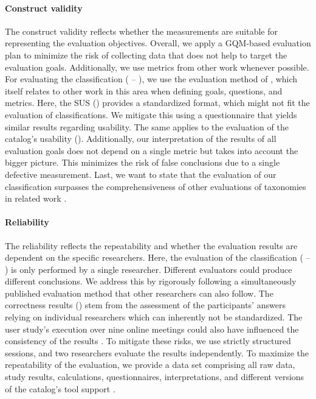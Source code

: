 \paragraph*{Construct validity}
The construct validity reflects whether the measurements are suitable for representing the evaluation objectives.
Overall, we apply a \ac{GQM}-based evaluation plan \cite{basili_goal_1994,basili_methodology_1984} to minimize the risk of collecting data that does not help to target the evaluation goals.
Additionally, we use metrics from other work whenever possible.
For evaluating the classification ( -- ), we use the evaluation method of \textcite{kaplan_introducing_2022}, which itself relates to other work in this area when defining goals, questions, and metrics.
Here, the \ac{SUS} () provides a standardized format, which might not fit the evaluation of classifications.
We mitigate this using a questionnaire that yields similar results regarding usability.
The same applies to the evaluation of the catalog's usability ().
Additionally, our interpretation of the results of all evaluation goals does not depend on a single metric but takes into account the bigger picture.
This minimizes the risk of false conclusions due to a single defective measurement.
Last, we want to state that the evaluation of our classification surpasses the comprehensiveness of other evaluations of taxonomies in related work \cite{mahdavi-hezavehi_classification_2017,bures_capturing_2020,perez-palacin_uncertainties_2014}.


\paragraph*{Reliability}
The reliability reflects the repeatability and whether the evaluation results are dependent on the specific researchers.
Here, the evaluation of the classification ( -- ) is only performed by a single researcher.
Different evaluators could produce different conclusions.
We address this by rigorously following a simultaneously published evaluation method \cite{kaplan_introducing_2022} that other researchers can also follow.
The correctness results () stem from the assessment of the participants' answers relying on individual researchers which can inherently not be standardized.
The user study's execution over nine online meetings could also have influenced the consistency of the results \cite{gehrig_enabling_2023}.
To mitigate these risks, we use strictly structured sessions, and two researchers evaluate the results independently.
To maximize the repeatability of the evaluation, we provide a data set \cite{dataset} comprising all raw data, study results, calculations, questionnaires, interpretations, and different versions of the catalog's tool support \arcen.





